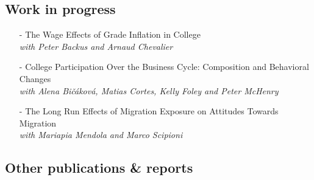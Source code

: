 \documentclass[11pt]{article}
\begin{document}
\subsection*{\sc Work in progress}

\begin{itemize}[itemsep=0pt, leftmargin=20pt]
\item [-]{The Wage Effects of Grade Inflation in College}\\
\emph{with Peter Backus and Arnaud Chevalier}
\item [-]College Participation Over the Business Cycle: Composition and Behavioral Changes\\
\emph{with Alena Bi\v{c}\'{a}kov\'{a}, Matias Cortes, Kelly Foley and Peter McHenry}
\item [-]{The Long Run Effects of Migration Exposure on Attitudes Towards Migration}\\
\emph{with Mariapia Mendola and Marco Scipioni}
\end{itemize}

\subsection*{\sc Other publications \& reports}
\end{document}
